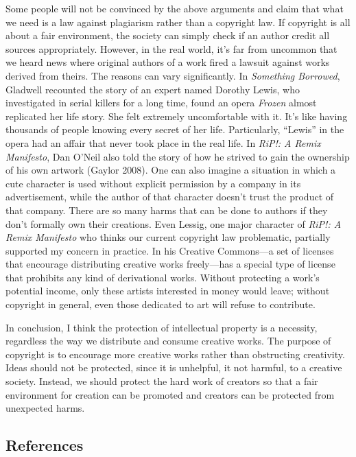 \documentclass{writing}
\begin{document}
Some people will not be convinced by the above arguments and claim that
what we need is a law against plagiarism rather than a copyright law. If
copyright is all about a fair environment, the society can simply check
if an author credit all sources appropriately. However, in the real
world, it's far from uncommon that we heard news where original authors
of a work fired a lawsuit against works derived from theirs. The reasons
can vary significantly. In \emph{Something Borrowed}, Gladwell recounted
the story of an expert named Dorothy Lewis, who investigated in serial
killers for a long time, found an opera \emph{Frozen} almost replicated
her life story. She felt extremely uncomfortable with it. It's like
having thousands of people knowing every secret of her life.
Particularly, ``Lewis'' in the opera had an affair that never took place
in the real life. In \emph{RiP!: A Remix Manifesto}, Dan O'Neil also
told the story of how he strived to gain the ownership of his own
artwork (Gaylor 2008). One can also imagine a situation in which a cute
character is used without explicit permission by a company in its
advertisement, while the author of that character doesn't trust the
product of that company. There are so many harms that can be done to
authors if they don't formally own their creations. Even Lessig, one
major character of \emph{RiP!: A Remix Manifesto} who thinks our current
copyright law problematic, partially supported my concern in practice.
In his Creative Commons---a set of licenses that encourage distributing
creative works freely---has a special type of license that prohibits any
kind of derivational works. Without protecting a work's potential
income, only these artists interested in money would leave; without
copyright in general, even those dedicated to art will refuse to
contribute.

In conclusion, I think the protection of intellectual property is a
necessity, regardless the way we distribute and consume creative works.
The purpose of copyright is to encourage more creative works rather than
obstructing creativity. Ideas should not be protected, since it is
unhelpful, it not harmful, to a creative society. Instead, we should
protect the hard work of creators so that a fair environment for
creation can be promoted and creators can be protected from unexpected
harms.

\subsection{References}\label{references}
\end{document}
